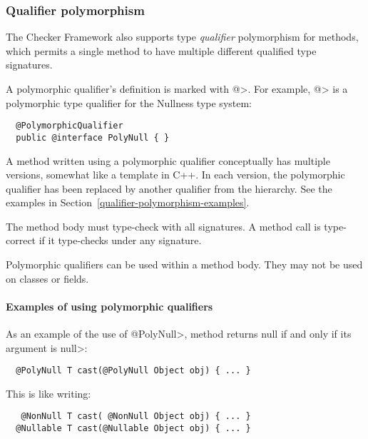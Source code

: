 \subsubsection{Qualifier polymorphism\label{qualifier-polymorphism}}

The Checker Framework also supports type \emph{qualifier} polymorphism for methods,
which permits a single method to have multiple different qualified type
signatures.

A polymorphic qualifier's definition is marked with
\<@>.  For example, 
\<@> is a polymorphic type
qualifier for the Nullness type system:

\begin{Verbatim}
  @PolymorphicQualifier
  public @interface PolyNull { }
\end{Verbatim}

A method written using a polymorphic qualifier conceptually has multiple
versions, somewhat like a template in C++.  In each version, the
polymorphic qualifier has been replaced by another qualifier from the
hierarchy.  See the examples in Section~\ref{qualifier-polymorphism-examples}.

The method body must type-check with all signatures.  A method call is
type-correct if it type-checks under any signature.

Polymorphic qualifiers can be used within a method body.  They may not be
used on classes or fields.


\paragraph{Examples of using polymorphic qualifiers\label{qualifier-polymorphism-examples}}

As an example of the use of \<@PolyNull>, method 
returns null if and only if its argument is \<null>:

\begin{Verbatim}
  @PolyNull T cast(@PolyNull Object obj) { ... }
\end{Verbatim}

\noindent
This is like writing:

\begin{Verbatim}
   @NonNull T cast( @NonNull Object obj) { ... }
  @Nullable T cast(@Nullable Object obj) { ... }
\end{Verbatim}

